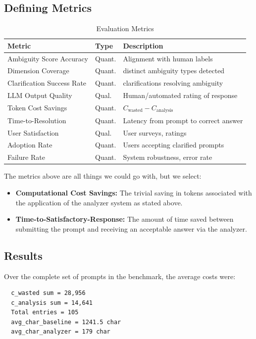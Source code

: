 \documentclass[11pt,a4paper]{article}
\begin{document}
\subsection{Defining Metrics}
\begin{table}[t]
\begin{center}
\small  %
\begin{tabular}{p{3.3cm}p{0.7cm}p{3.7cm}}
\hline \bf Metric & \bf Type & \bf Description \\ \hline
Ambiguity Score Accuracy & Quant. & Alignment with human labels \\
Dimension Coverage & Quant. & distinct ambiguity types detected \\
Clarification Success Rate & Quant. & clarifications resolving ambiguity \\
LLM Output Quality & Qual. & Human/automated rating of response \\
Token Cost Savings & Quant. & \( C_{\text{wasted}} - C_{\text{analysis}} \) \\
Time-to-Resolution & Quant. & Latency from prompt to correct answer \\
User Satisfaction & Qual. & User surveys, ratings \\
Adoption Rate & Quant. & Users accepting clarified prompts \\
Failure Rate & Quant. & System robustness, error rate \\ \bottomrule
\end{tabular}
\end{center}
\caption{\label{tab:metrics} Evaluation Metrics}
\end{table}


The metrics above are all things we could go with, but we select:
\begin{itemize}
    \item \textbf{Computational Cost Savings:}
    The trivial saving in tokens associated with the application of the analyzer system as stated above.
    \item \textbf{Time-to-Satisfactory-Response:}
    The amount of time saved between submitting the prompt and receiving an acceptable answer via the analyzer.
\end{itemize}

\subsection{Results}
Over the complete set of prompts in the benchmark, the average costs were:
\begin{verbatim}
  c_wasted sum = 28,956
  c_analysis sum = 14,641
  Total entries = 105
  avg_char_baseline = 1241.5 char
  avg_char_analyzer = 179 char
\end{verbatim}
\end{document}
